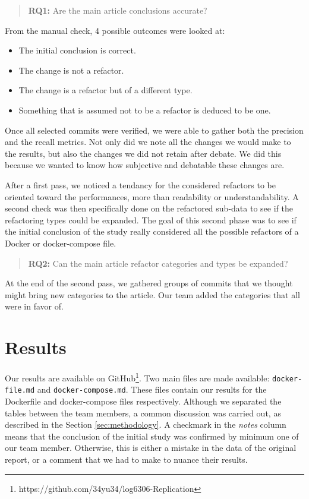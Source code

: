 \documentclass[lettersize,journal]{IEEEtran}
\begin{document}
\begin{quote}
        \textbf{RQ1:} Are the main article conclusions accurate?
\end{quote}
From the manual check, 4 possible outcomes were looked at:
\begin{itemize}
        \item The initial conclusion is correct.
        \item The change is not a refactor.
        \item The change is a refactor but of a different type.
        \item Something that is assumed not to be a refactor is deduced to be one.
\end{itemize}
Once all selected commits were verified, we were able to gather both the precision and the recall metrics.
Not only did we note all the changes we would make to the results, but also the changes we did not retain after debate.
We did this because we wanted to know how subjective and debatable these changes are.

After a first pass, we noticed a tendancy for the considered refactors to be oriented toward the performances, more than readability or understandability.
A second check was then specifically done on the refactored sub-data to see if the refactoring types could be expanded.
The goal of this second phase was to see if the initial conclusion of the study really considered all the possible refactors of a Docker or docker-compose file.

\begin{quote}
        \textbf{RQ2:} Can the main article refactor categories and types be expanded?
\end{quote}
At the end of the second pass, we gathered groups of commits that we thought might bring new categories to the article.
Our team added the categories that all were in favor of.

\section{Results}

Our results are available on GitHub\footnote{https://github.com/34yu34/log6306-Replication}.
Two main files are made available: \texttt{docker-file.md} and \texttt{docker-compose.md}. These files contain our results for the Dockerfile and docker-compose files respectively.
Although we separated the tables between the team members, a common discussion was carried out, as described in the Section \ref{sec:methodology}.
A checkmark in the \textit{notes} column means that the conclusion of the initial study was confirmed by minimum one of our team member.
Otherwise, this is either a mistake in the data of the original report, or a comment that we had to make to nuance their results.
\end{document}
